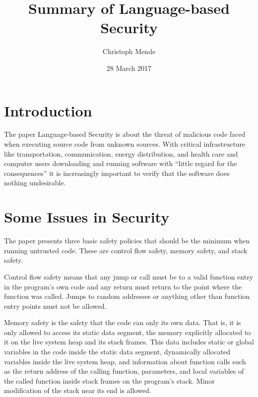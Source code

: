 \documentclass[acmlarge]{acmart}
\begin{document}

\title{Summary of Language-based Security}
\author{Christoph Mende}
\date{28 March 2017}
\maketitle


\section{Introduction}

The paper Language-based Security\cite{Kozen:1999:LS:645728.667701} is about the threat of malicious code faced when executing source code from unknown sources. With critical infrastructure like transportation, communication, energy distribution, and health care and computer users downloading and running software with ``little regard for the consequences'' it is increasingly important to verify that the software does nothing undesirable.


\section{Some Issues in Security}

The paper presents three basic safety policies that should be the minimum when running untrusted code. These are control flow safety, memory safety, and stack safety.

Control flow safety means that any jump or call must be to a valid function entry in the program's own code and any return must return to the point where the function was called. Jumps to random addresses or anything other than function entry points must not be allowed.

Memory safety is the safety that the code can only its own data. That is, it is only allowed to access its static data segment, the memory explicitly allocated to it on the live system heap and its stack frames. This data includes static or global variables in the code inside the static data segment, dynamically allocated variables inside the live system heap, and information about function calls such as the return address of the calling function, parameters, and local variables of the called function inside stack frames on the program's stack. Minor modification of the stack near its end is allowed.
\end{document}
